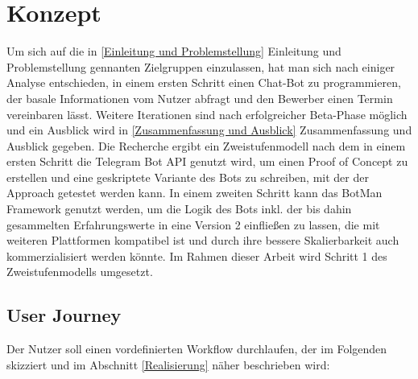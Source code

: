 \label{Konzept}
\chapter{Konzept}

Um sich auf die in \ref{Einleitung und Problemstellung} Einleitung und Problemstellung gennanten Zielgruppen einzulassen, hat man sich nach einiger Analyse entschieden, in einem ersten Schritt einen Chat-Bot zu programmieren, der basale Informationen vom Nutzer abfragt und den Bewerber einen Termin vereinbaren lässt. Weitere Iterationen sind nach erfolgreicher Beta-Phase möglich und ein Ausblick wird in \ref{Zusammenfassung und Ausblick} Zusammenfassung und Ausblick gegeben. Die Recherche ergibt ein Zweistufenmodell nach dem in einem ersten Schritt die Telegram Bot API genutzt wird, um einen Proof of Concept zu erstellen und eine geskriptete Variante des Bots zu schreiben, mit der der Approach getestet werden kann. In einem zweiten Schritt kann das BotMan Framework genutzt werden, um die Logik des Bots inkl. der bis dahin gesammelten Erfahrungswerte in eine Version 2 einfließen zu lassen, die mit weiteren Plattformen kompatibel ist und durch ihre bessere Skalierbarkeit auch kommerzialisiert werden könnte. Im Rahmen dieser Arbeit wird Schritt 1 des Zweistufenmodells umgesetzt.

\section{User Journey} \label{User Journey}
	Der Nutzer soll einen vordefinierten Workflow durchlaufen, der im Folgenden skizziert und im Abschnitt \ref*{Realisierung} näher beschrieben wird:

